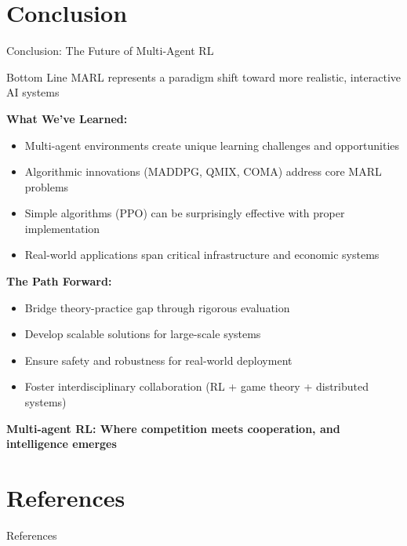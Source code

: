 \documentclass[aspectratio=169]{beamer}
\begin{document}
\section{Conclusion}

\begin{frame}{Conclusion: The Future of Multi-Agent RL}
    
    \begin{block}{Bottom Line}
        MARL represents a paradigm shift toward more realistic, interactive AI systems
    \end{block}
    
    \vfill
    
    \textbf{What We've Learned:}
    \begin{itemize}
        \item Multi-agent environments create unique learning challenges and opportunities
        \item Algorithmic innovations (MADDPG, QMIX, COMA) address core MARL problems
        \item Simple algorithms (PPO) can be surprisingly effective with proper implementation
        \item Real-world applications span critical infrastructure and economic systems
    \end{itemize}
    
    \vfill
    
    \textbf{The Path Forward:}
    \begin{itemize}
        \item Bridge theory-practice gap through rigorous evaluation
        \item Develop scalable solutions for large-scale systems
        \item Ensure safety and robustness for real-world deployment
        \item Foster interdisciplinary collaboration (RL + game theory + distributed systems)
    \end{itemize}
    
    \vfill
    
    \begin{center}
        \textbf{Multi-agent RL: Where competition meets cooperation, and intelligence emerges}
    \end{center}
\end{frame}

\section{References}

\begin{frame}[allowframebreaks]{References}
    \printbibliography[heading=none]
\end{frame}
\end{document}
